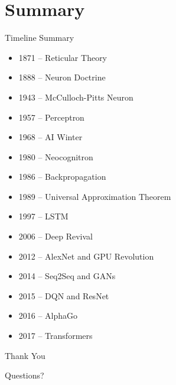 \documentclass{beamer}
\begin{document}
\section{Summary}

\begin{frame}{Timeline Summary}

\begin{itemize}

\item 1871 -- Reticular Theory

\item 1888 -- Neuron Doctrine

\item 1943 -- McCulloch-Pitts Neuron

\item 1957 -- Perceptron

\item 1968 -- AI Winter

\item 1980 -- Neocognitron

\item 1986 -- Backpropagation

\item 1989 -- Universal Approximation Theorem

\item 1997 -- LSTM

\item 2006 -- Deep Revival

\item 2012 -- AlexNet and GPU Revolution

\item 2014 -- Seq2Seq and GANs

\item 2015 -- DQN and ResNet

\item 2016 -- AlphaGo

\item 2017 -- Transformers

\end{itemize}

\end{frame}


\begin{frame}
\Huge{\centerline{Thank You}}
\vspace{0.5cm}
\Large{\centerline{Questions?}}
\end{frame}

\end{document}
